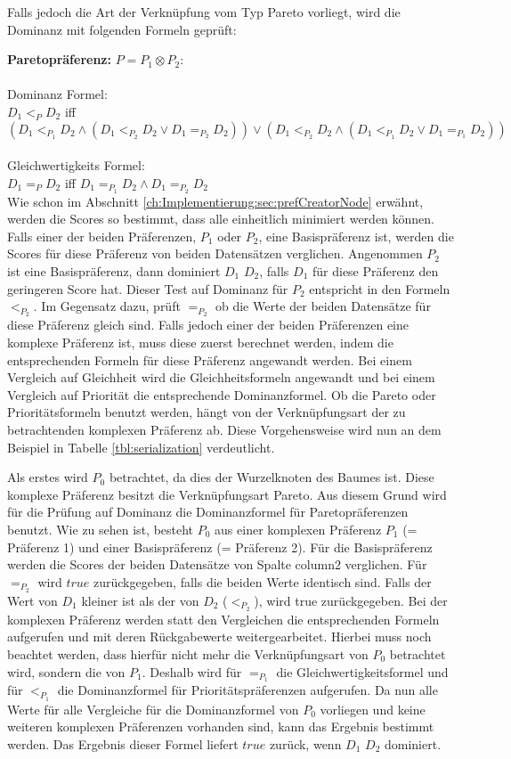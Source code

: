 Falls jedoch die Art der Verknüpfung vom Typ Pareto vorliegt, wird die Dominanz mit folgenden Formeln geprüft:

\textbf{Paretopräferenz:} $P = P_1 \otimes P_2:$ \\ \\
Dominanz Formel:\\
$D_1  <_P D_2$ iff $(D_1 <_{P_1} D_2 \land (D_1 <_{P_2} D_2 \lor D_1 =_{P_2} D_2)) \lor (D_1 <_{P_2} D_2 \land (D_1 <_{P_1} D_2 \lor D_1 =_{P_1} D_2))$ \\ \\
Gleichwertigkeits Formel: \\
$D_1 =_P D_2$ iff $D_1 =_{P_1} D_2 \land D_1 =_{P_2} D_2$ \\

Wie schon im Abschnitt \ref{ch:Implementierung:sec:prefCreatorNode} erwähnt, werden die Scores so bestimmt, dass alle einheitlich minimiert werden können. Falls einer der beiden Präferenzen, $P_1$ oder $P_2$, eine Basispräferenz ist, werden die Scores für diese Präferenz von beiden Datensätzen verglichen. Angenommen $P_2$ ist eine Basispräferenz, dann dominiert $D_1$ $D_2$, falls $D_1$ für diese Präferenz den geringeren Score hat. Dieser Test auf Dominanz für $P_2$ entspricht in den Formeln $<_ {P_2}$. Im Gegensatz dazu, prüft $=_{P_2}$ ob die Werte der beiden Datensätze für diese Präferenz gleich sind. 
Falls jedoch einer der beiden Präferenzen eine komplexe Präferenz ist, muss diese zuerst berechnet werden, indem die entsprechenden Formeln für diese Präferenz angewandt werden. Bei einem Vergleich auf Gleichheit wird die Gleichheitsformeln angewandt und bei einem Vergleich auf Priorität die entsprechende Dominanzformel. Ob die Pareto oder Prioritätsformeln benutzt werden, hängt von der Verknüpfungsart der zu betrachtenden komplexen Präferenz ab. Diese Vorgehensweise wird nun an dem Beispiel in Tabelle \ref{tbl:serialization} verdeutlicht.

Als erstes wird $P_0$ betrachtet, da dies der Wurzelknoten des Baumes ist. Diese komplexe Präferenz besitzt die Verknüpfungsart Pareto. Aus diesem Grund wird für die Prüfung auf Dominanz die Dominanzformel für Paretopräferenzen benutzt. Wie zu sehen ist, besteht $P_0$ aus einer komplexen Präferenz $P_1$ (= Präferenz 1) und einer Basispräferenz (= Präferenz 2). Für die Basispräferenz werden die Scores der beiden Datensätze von Spalte column2 verglichen. Für $=_{P_2}$ wird $true$ zurückgegeben, falls die beiden Werte identisch sind. Falls der Wert von $D_1$ kleiner ist als der von $D_2$ ($<_{P_2}$), wird true zurückgegeben.
Bei der komplexen Präferenz werden statt den Vergleichen die entsprechenden Formeln aufgerufen und mit deren Rückgabewerte weitergearbeitet. Hierbei muss noch  beachtet werden, dass hierfür nicht mehr die Verknüpfungsart von $P_0$ betrachtet wird, sondern die von $P_1$. Deshalb wird für $=_{P_1}$ die Gleichwertigkeitsformel und für $<_{P_1}$ die Dominanzformel für Prioritätspräferenzen aufgerufen. 
Da nun alle Werte für alle Vergleiche für die Dominanzformel von $P_0$ vorliegen und keine weiteren komplexen Präferenzen vorhanden sind, kann das Ergebnis bestimmt werden. Das Ergebnis dieser Formel liefert $true$ zurück, wenn $D_1$ $D_2$ dominiert.

